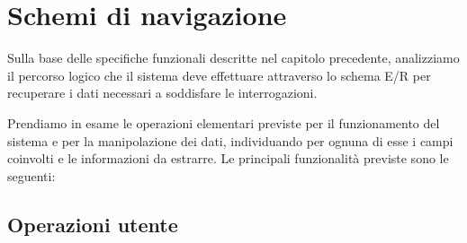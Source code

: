 \documentclass[a4paper,12pt]{report}
\begin{document}
\section{Schemi di navigazione}

Sulla base delle specifiche funzionali descritte nel capitolo precedente, analizziamo il percorso logico che il sistema deve effettuare attraverso lo schema E/R per recuperare i dati necessari a soddisfare le interrogazioni.

Prendiamo in esame le operazioni elementari previste per il funzionamento del sistema e per la
manipolazione dei dati, individuando per ognuna di esse i campi coinvolti e le informazioni da estrarre. Le
principali funzionalità previste sono le seguenti:

\subsection{Operazioni utente}
\end{document}
